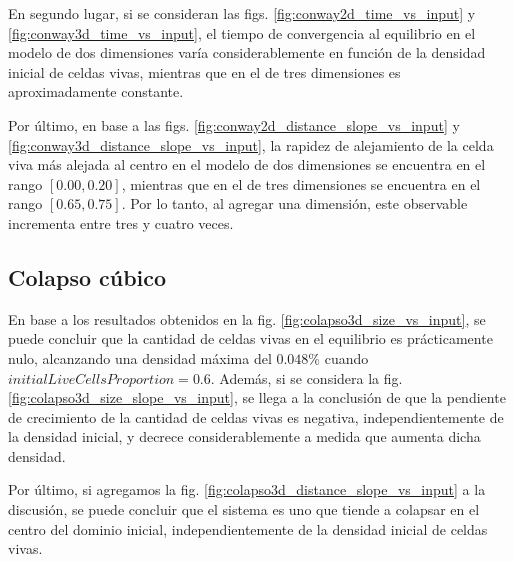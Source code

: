 En segundo lugar, si se consideran las figs. \ref{fig:conway2d_time_vs_input} y \ref{fig:conway3d_time_vs_input},
el tiempo de convergencia al equilibrio en el modelo de dos dimensiones varía considerablemente en función
de la densidad inicial de celdas vivas, mientras que en el de tres dimensiones es aproximadamente constante.

Por último, en base a las figs. \ref{fig:conway2d_distance_slope_vs_input} y \ref{fig:conway3d_distance_slope_vs_input},
la rapidez de alejamiento de la celda viva más alejada al centro en el modelo de dos dimensiones se encuentra en el
rango $[0.00, 0.20]$, mientras que en el de tres dimensiones se encuentra en el rango $[0.65, 0.75]$.
Por lo tanto, al agregar una dimensión, este observable incrementa entre tres y cuatro veces.

\subsection{Colapso cúbico}\label{subsec:colapso-cubico-conc}
En base a los resultados obtenidos en la fig. \ref{fig:colapso3d_size_vs_input}, se puede concluir que
la cantidad de celdas vivas en el equilibrio es prácticamente nulo, alcanzando una densidad máxima del
$0.048\%$ cuando $initialLiveCellsProportion = 0.6$.
Además, si se considera la fig. \ref{fig:colapso3d_size_slope_vs_input}, se llega a la conclusión de que
la pendiente de crecimiento de la cantidad de celdas vivas es negativa, independientemente de la densidad inicial,
y decrece considerablemente a medida que aumenta dicha densidad.

Por último, si agregamos la fig. \ref{fig:colapso3d_distance_slope_vs_input} a la discusión, se puede concluir que
el sistema es uno que tiende a colapsar en el centro del dominio inicial, independientemente de la densidad inicial de celdas vivas.